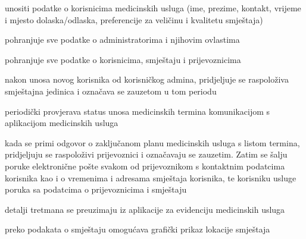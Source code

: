 \begin{packed_enum}
\begin{packed_enum}
					\item unositi podatke o korisnicima medicinskih usluga (ime, prezime, kontakt, vrijeme i mjesto dolaska/odlaska, preferencije za veličinu i kvalitetu smještaja)
					
					
				\end{packed_enum}
				
				\pagebreak
				
				
				\item {}
				
				\begin{packed_enum}
					
					\item pohranjuje sve podatke o administratorima i njihovim ovlastima
					\item  pohranjuje sve podatke o korisnicima, smještaju i prijevoznicima
					\item nakon unosa novog korisnika od korisničkog admina, pridjeljuje se raspoloživa smještajna jedinica i označava se zauzetom u tom periodu
					\item periodički provjerava status unosa medicinskih termina komunikacijom s aplikacijom medicinskih usluga
					\item kada se primi odgovor o zaključanom planu medicinskih usluga s listom termina, pridjeljuju se raspoloživi prijevoznici i označavaju se zauzetim. Zatim se šalju poruke elektronične pošte svakom od prijevoznikom s kontaktnim podatcima korisnika kao i o vremenima i adresama smještaja korisnika, te korisniku usluge poruka sa podatcima o prijevoznicima i smještaju
					
				\end{packed_enum}
				
				\item {}
				
				\begin{packed_enum}
					
					\item detalji tretmana se preuzimaju iz aplikacije za evidenciju medicinskih usluga
					
				\end{packed_enum}
				
				
				\item {}
				
				\begin{packed_enum}
					
					\item preko podakata o smještaju omogućava grafički prikaz lokacije smještaja
					
				\end{packed_enum}
				
			\end{packed_enum}
			
